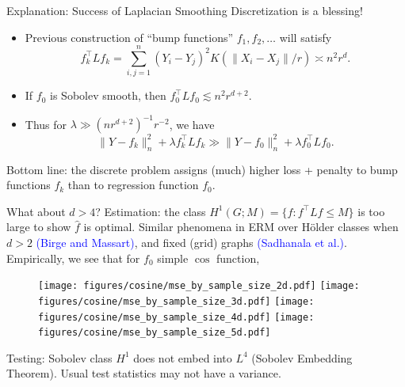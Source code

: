 \documentclass[xcolor=dvipsnames]{beamer}
\newcommand{\wh}[1]{\widehat{#1}}
\newcommand{\blue}[1]{\textcolor{blue}{#1}}
\begin{document}
\begin{frame}{Explanation: Success of Laplacian Smoothing}
\alert{Discretization} is a blessing!  
\begin{itemize}
	\item Previous construction of ``bump functions'' $f_1,f_2,\ldots$ will satisfy
	\begin{equation*}
	f_k^{\top} L f_k = \sum_{i,j = 1}^{n} (Y_i - Y_j)^2 K(\|X_i - X_j\|/r) \asymp n^2r^{d}.
	\end{equation*}
	\item If $f_0$ is Sobolev smooth, then $f_0^{\top} L f_0 \lesssim n^2r^{d + 2}$.
	\item Thus for $\lambda \gg (nr^{d + 2})^{-1} r^{-2}$, we have
	\begin{equation*}
	\|Y - f_k\|_n^2 + \lambda f_k^{\top} L f_k \gg \|Y - f_0\|_n^2 + \lambda f_0^{\top} L f_0.
	\end{equation*}
\end{itemize}
\alert{Bottom line}: the discrete problem assigns (much) higher loss + penalty to bump functions $f_k$ than to regression function $f_0$.
\end{frame}


\begin{frame}{What about $d > 4$?}
\alert{Estimation}: the class $H^1(G;M) = \{f: f^{\top}Lf \leq M\}$ is too large to show $\wh{f}$ is optimal. Similar phenomena in ERM over H\"{o}lder classes when $d > 2$ \blue{(Birge and Massart)}, and fixed (grid) graphs \blue{(Sadhanala et al.)}. Empirically, we see that for $f_0$ simple $\cos$ function,
\begin{figure}[tb]
	\texttt{[image: figures/cosine/mse\_by\_sample\_size\_2d.pdf]}
	\texttt{[image: figures/cosine/mse\_by\_sample\_size\_3d.pdf]} 
	\texttt{[image: figures/cosine/mse\_by\_sample\_size\_4d.pdf]}
	\texttt{[image: figures/cosine/mse\_by\_sample\_size\_5d.pdf]}
\end{figure}

\alert{Testing}: Sobolev class $H^1$ does not embed into $L^4$ (Sobolev Embedding Theorem). Usual test statistics may not have a variance.
\end{frame}
\end{document}
